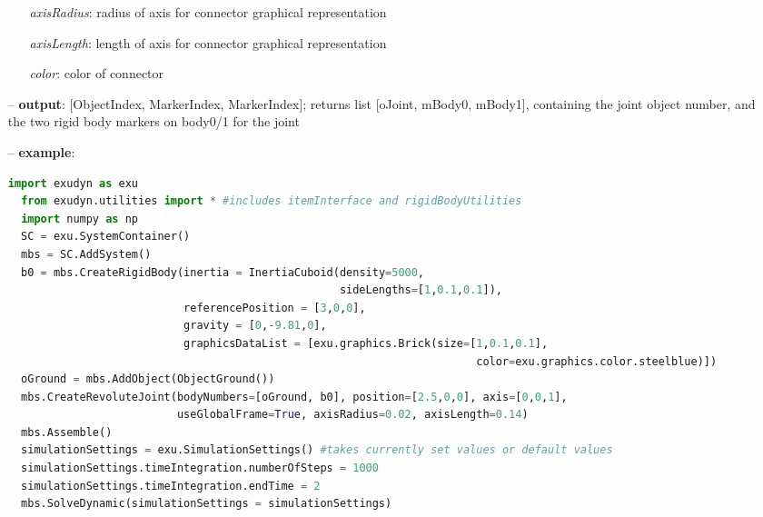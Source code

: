 \begin{itemize}[leftmargin=0.7cm]
\begin{itemize}[leftmargin=1.2cm]
\item[]{\it axisRadius}: radius of axis for connector graphical representation
\item[]{\it axisLength}: length of axis for connector graphical representation
\item[]{\it color}: color of connector
\end{itemize}
\item[--]
{\bf output}: [ObjectIndex, MarkerIndex, MarkerIndex]; returns list [oJoint, mBody0, mBody1], containing the joint object number, and the two rigid body markers on body0/1 for the joint
\item[--]
{\bf example}: \vspace{-12pt}\ei\begin{lstlisting}[language=Python, xleftmargin=36pt]
  import exudyn as exu
  from exudyn.utilities import * #includes itemInterface and rigidBodyUtilities
  import numpy as np
  SC = exu.SystemContainer()
  mbs = SC.AddSystem()
  b0 = mbs.CreateRigidBody(inertia = InertiaCuboid(density=5000,
                                                   sideLengths=[1,0.1,0.1]),
                           referencePosition = [3,0,0],
                           gravity = [0,-9.81,0],
                           graphicsDataList = [exu.graphics.Brick(size=[1,0.1,0.1],
                                                                        color=exu.graphics.color.steelblue)])
  oGround = mbs.AddObject(ObjectGround())
  mbs.CreateRevoluteJoint(bodyNumbers=[oGround, b0], position=[2.5,0,0], axis=[0,0,1],
                          useGlobalFrame=True, axisRadius=0.02, axisLength=0.14)
  mbs.Assemble()
  simulationSettings = exu.SimulationSettings() #takes currently set values or default values
  simulationSettings.timeIntegration.numberOfSteps = 1000
  simulationSettings.timeIntegration.endTime = 2
  mbs.SolveDynamic(simulationSettings = simulationSettings)
\end{lstlisting}\vspace{-24pt}\bi\item[]\vspace{-24pt}\vspace{12pt}\end{itemize}
%

